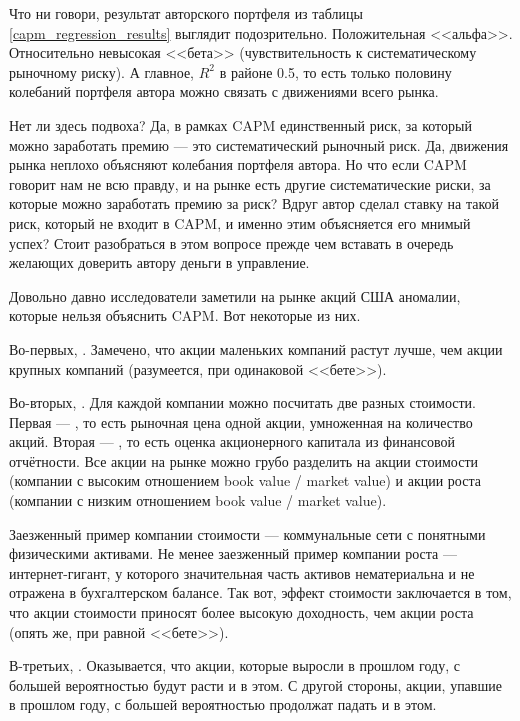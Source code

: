 Что ни говори, результат авторского портфеля из таблицы 
\ref{capm_regression_results} выглядит подозрительно. Положительная <<альфа>>. 
Относительно невысокая <<бета>> (чувствительность к систематическому рыночному 
риску). А главное, $R^2$ в районе 0.5, то есть только половину колебаний 
портфеля автора можно связать с движениями всего рынка.

Нет ли здесь подвоха? Да, в рамках CAPM единственный риск, за который можно 
заработать премию --- это систематический рыночный риск. Да, движения рынка 
неплохо объясняют колебания портфеля автора. Но что если CAPM говорит нам не всю 
правду, и на рынке есть другие систематические риски, за которые можно 
заработать премию за риск? Вдруг автор сделал ставку на такой риск, который не 
входит в CAPM, и именно этим объясняется его мнимый успех? Стоит разобраться в 
этом вопросе прежде чем вставать в очередь желающих доверить автору деньги в 
управление.

Довольно давно исследователи заметили на рынке акций США аномалии, которые 
нельзя объяснить CAPM. Вот некоторые из них.

Во-первых, . Замечено, что акции маленьких 
компаний растут лучше, чем акции крупных компаний (разумеется, при одинаковой 
<<бете>>).

Во-вторых, . Для каждой компании можно 
посчитать две разных стоимости. Первая --- , то есть рыночная цена одной акции, умноженная на количество акций. 
Вторая --- , то есть оценка 
акционерного капитала из финансовой отчётности. Все акции на рынке можно грубо 
разделить на акции стоимости (компании с высоким отношением book value / market 
value) и акции роста (компании с низким отношением book value / market value).

Заезженный пример компании стоимости --- коммунальные сети с понятными 
физическими активами. Не менее заезженный пример компании роста --- 
интернет-гигант, у которого значительная часть активов нематериальна и не 
отражена в бухгалтерском балансе. Так вот, эффект стоимости заключается в том, 
что акции стоимости приносят более высокую доходность, чем акции роста (опять 
же, при равной <<бете>>).

В-третьих, . Оказывается, что акции, 
которые выросли в прошлом году, с большей вероятностью будут расти и в этом. С 
другой стороны, акции, упавшие в прошлом году, с большей вероятностью продолжат 
падать и в этом.

